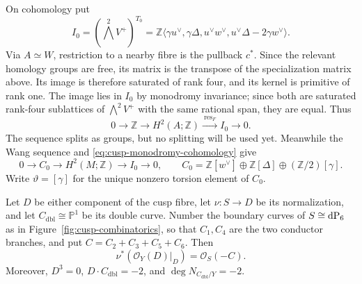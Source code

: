 On cohomology put
\begin{equation*}
 I_0=(\textstyle\bigwedge^2V^+)^{T_0}
 =\mathbb Z\langle
 \gamma u^\vee,\gamma\Delta,u^\vee w^\vee,
 u^\vee\Delta-2\gamma w^\vee\rangle.
\end{equation*}
Via $A\simeq W$, restriction to a nearby fibre is the pullback $c^*$.
Since the relevant homology groups are free, its matrix is the transpose of
the specialization matrix above.  Its image is therefore saturated of rank
four, and its kernel is primitive of rank one.  The image lies in $I_0$ by
monodromy invariance; since both are saturated rank-four sublattices of
$\bigwedge^2V^+$ with the same rational span, they are equal.  Thus
\begin{equation}\label{eq:cusp-H2-splitting}
 0\longrightarrow\mathbb Z
 \longrightarrow H^2(A;\mathbb Z)
 \xrightarrow{\ \operatorname{res}_F\ } I_0\longrightarrow0.
\end{equation}
The sequence splits as groups, but no splitting will be used yet.  Meanwhile
the Wang sequence and \eqref{eq:cusp-monodromy-cohomology} give
\begin{equation}\label{eq:cusp-Wang}
 0\longrightarrow C_0\longrightarrow H^2(M;\mathbb Z)
 \longrightarrow I_0\longrightarrow0,
 \qquad
 C_0=\mathbb Z[w^\vee]\oplus\mathbb Z[\Delta]
       \oplus(\mathbb Z/2)[\gamma].
\end{equation}
Write $\vartheta=[\gamma]$ for the unique nonzero torsion element of $C_0$.

\begin{lemma}
\label{lem:cusp-double-curve}
Let $D$ be either component of the cusp fibre, let
$\nu:S\to D$ be its normalization, and let
$C_{\mathrm{dbl}}\cong\mathbb P^1$ be its double curve.  Number the boundary
curves of $S\cong\operatorname{dP}_6$ as in Figure~\ref{fig:cusp-combinatorics}, so that
$C_1,C_4$ are the two conductor branches, and put
$C=C_2+C_3+C_5+C_6$.  Then
\begin{equation}\label{eq:normalization-normal-bundle}
 \nu^*(\mathcal O_Y(D)|_D)=\mathcal O_S(-C).
\end{equation}
Moreover, $D^3=0$, $D\cdot C_{\mathrm{dbl}}=-2$, and
$\deg N_{C_{\mathrm{dbl}}/Y}=-2$.
\end{lemma}

